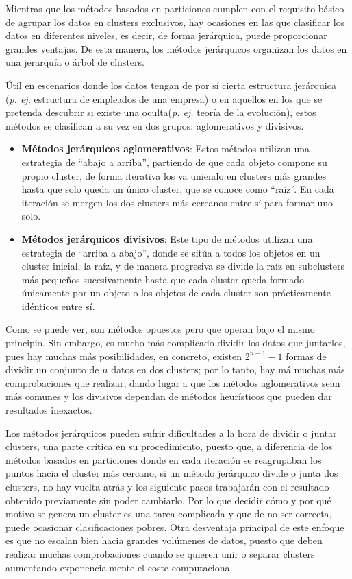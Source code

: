 \documentclass[10pt, a4paper]{article}
\begin{document}
\cite{LIBRO} Mientras que los métodos basados en particiones cumplen con el requisito básico de agrupar los datos en clusters exclusivos, hay ocasiones en las que clasificar los datos en diferentes niveles, es decir, de forma jerárquica, puede proporcionar grandes ventajas. De esta manera, los métodos jerárquicos organizan los datos en una jerarquía o árbol de clusters. 

Útil en escenarios donde los datos tengan de por sí cierta estructura jerárquica (\textit{p. ej.} estructura de empleados de una empresa) o en aquellos en los que se pretenda descubrir si existe una oculta(\textit{p. ej.} teoría de la evolución), estos métodos se clasifican a su vez en dos grupos: aglomerativos y divisivos. 

\begin{itemize}
  \item \textbf{Métodos jerárquicos aglomerativos}: Estos métodos utilizan una estrategia de ``abajo a arriba'', partiendo de que cada objeto compone su propio cluster, de forma iterativa los va uniendo en clusters más grandes hasta que solo queda un único cluster, que se conoce como ``raíz''. En cada iteración se mergen los dos clusters más cercanos entre sí para formar uno solo.

  \item \textbf{Métodos jerárquicos divisivos}: Este tipo de métodos utilizan una estrategia de ``arriba a abajo'', donde se sitúa a todos los objetos en un cluster inicial, la raíz, y de manera progresiva se divide la raíz en subclusters más pequeños sucesivamente hasta que cada cluster queda formado únicamente por un objeto o los objetos de cada cluster son prácticamente idénticos entre sí.
\end{itemize}

Como se puede ver, son métodos opuestos pero que operan bajo el mismo principio. Sin embargo, es mucho más complicado dividir los datos que juntarlos, pues hay muchas más posibilidades, en concreto, existen $2^{n-1}-1$ formas de dividir un conjunto de $n$ datos en dos clusters; por lo tanto, hay má muchas más comprobaciones que realizar, dando lugar a que los métodos aglomerativos sean más comunes y los divisivos dependan de métodos heurísticos que pueden dar resultados inexactos.

Los métodos jerárquicos pueden sufrir dificultades a la hora de dividir o juntar clusters, una parte crítica en su procedimiento, puesto que, a diferencia de los métodos basados en particiones donde en cada iteración se reagrupaban los puntos hacia el cluster más cercano, si un método jerárquico divide o junta dos clusters, no hay vuelta atrás y los siguiente pasos trabajarán con el resultado obtenido previamente sin poder cambiarlo. Por lo que decidir cómo y por qué motivo se genera un cluster es una tarea complicada y que de no ser correcta, puede ocasionar clasificaciones pobres. Otra desventaja principal de este enfoque es que no escalan bien hacia grandes volúmenes de datos, puesto que deben realizar muchas comprobaciones cuando se quieren unir o separar clusters aumentando exponencialmente el coste computacional.
\end{document}

